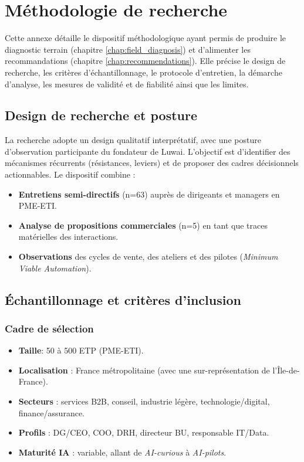\chapter{Méthodologie de recherche}
\label{app:methodologie}

Cette annexe détaille le dispositif méthodologique ayant permis de produire le diagnostic terrain (chapitre \ref{chap:field_diagnosis}) et d'alimenter les recommandations (chapitre \ref{chap:recommendations}). Elle précise le design de recherche, les critères d'échantillonnage, le protocole d'entretien, la démarche d'analyse, les mesures de validité et de fiabilité ainsi que les limites.

\section{Design de recherche et posture}
La recherche adopte un design qualitatif interprétatif, avec une posture d'observation participante du fondateur de Luwai. L'objectif est d'identifier des mécanismes récurrents (résistances, leviers) et de proposer des cadres décisionnels actionnables. Le dispositif combine :
\begin{itemize}
    \item \textbf{Entretiens semi-directifs} (n=63) auprès de dirigeants et managers en PME-ETI.
    \item \textbf{Analyse de propositions commerciales} (n=5) en tant que traces matérielles des interactions.
    \item \textbf{Observations} des cycles de vente, des ateliers et des pilotes (\emph{Minimum Viable Automation}).
\end{itemize}

\section{Échantillonnage et critères d'inclusion}
\subsection{Cadre de sélection}
\begin{itemize}
    \item \textbf{Taille}: 50 à 500 ETP (PME-ETI).
    \item \textbf{Localisation} : France métropolitaine (avec une sur-représentation de l'Île-de-France).
    \item \textbf{Secteurs} : services B2B, conseil, industrie légère, technologie/digital, finance/assurance.
    \item \textbf{Profils} : DG/CEO, COO, DRH, directeur BU, responsable IT/Data.
    \item \textbf{Maturité IA} : variable, allant de \emph{AI-curious} à \emph{AI-pilots}.
\end{itemize}

